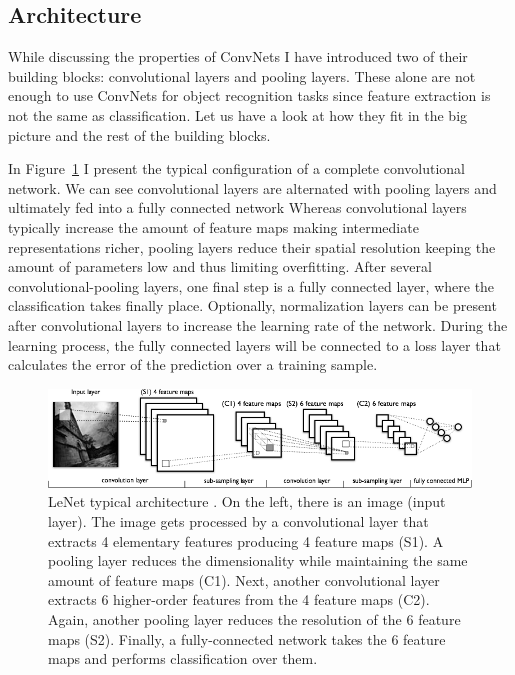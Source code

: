 \subsection{Architecture}
\label{sub:theory:convnets:achitecture}

While discussing the properties of ConvNets I have introduced two of their building blocks: convolutional layers and pooling layers.
These alone are not enough to use ConvNets for object recognition tasks since feature extraction is not the same as classification.
Let us have a look at how they fit in the big picture and the rest of the building blocks.

In Figure~\ref{fig:sec:theory:convnet} I present the typical configuration of a complete convolutional network.
We can see convolutional layers are alternated with pooling layers and ultimately fed into a fully connected network
Whereas convolutional layers typically increase the amount of feature maps making intermediate representations richer, pooling layers reduce their spatial resolution keeping the amount of parameters low and thus limiting overfitting.
After several convolutional-pooling layers, one final step is a fully connected layer, where the classification takes finally place.
Optionally, normalization layers can be present after convolutional layers to increase the learning rate of the network.
During the learning process, the fully connected layers will be connected to a loss layer that calculates the error of the prediction over a training sample.

\begin{figure}[htb]
  \begin{center}
    \includegraphics[width=\textwidth]{gfx/conv-network}
  \end{center}
  \caption{LeNet typical architecture \cite{Lisa2010}.
    On the left, there is an image (input layer).
    The image gets processed by a convolutional layer that extracts 4 elementary features producing 4 feature maps (S1).
    A pooling layer reduces the dimensionality while maintaining the same amount of feature maps (C1).
    Next, another convolutional layer extracts 6 higher-order features from the 4 feature maps (C2).
    Again, another pooling layer reduces the resolution of the 6 feature maps (S2).
    Finally, a fully-connected network takes the 6 feature maps and performs classification over them.}
  \label{fig:sec:theory:convnet}
\end{figure}

